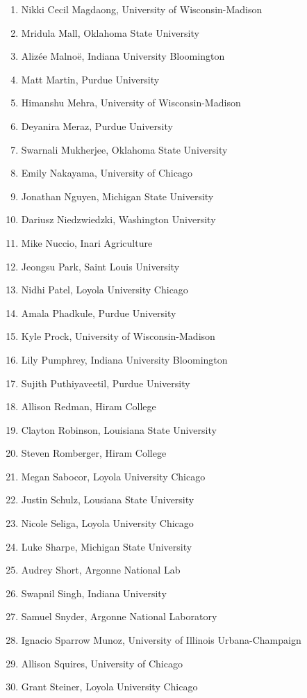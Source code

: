 \begin{multicols}{2}
\begin{enumerate}
\item Nikki Cecil	Magdaong,	University of Wisconsin-Madison
\item Mridula 	Mall,	Oklahoma State University
\item Alizée	Malnoë,	Indiana University Bloomington
\item Matt	Martin,	Purdue University
\item Himanshu 	Mehra,	University of Wisconsin-Madison
\item Deyanira	Meraz,	Purdue University
\item Swarnali	Mukherjee,	Oklahoma State University
\item Emily	Nakayama,	University of Chicago
\item Jonathan	Nguyen,	Michigan State University
\item Dariusz	Niedzwiedzki,	Washington University
\item Mike	Nuccio,	Inari Agriculture
\item Jeongsu	Park,	Saint Louis University
\item Nidhi	Patel,	Loyola University Chicago
\item Amala 	Phadkule,	Purdue University
\item Kyle	Prock,	University of Wisconsin-Madison
\item Lily	Pumphrey,	Indiana University Bloomington
\item Sujith	Puthiyaveetil,	Purdue University 
\item Allison	Redman,	Hiram College
\item Clayton	Robinson,	Louisiana State University
\item Steven	Romberger,	Hiram College
\item Megan	Sabocor,	Loyola University Chicago
\item Justin	Schulz,	Lousiana State University
\item Nicole	Seliga,	Loyola University Chicago
\item Luke	Sharpe,	Michigan State University
\item Audrey	Short,	Argonne National Lab
\item Swapnil	Singh,	Indiana University
\item Samuel	Snyder,	Argonne National Laboratory
\item Ignacio	Sparrow Munoz,	University of Illinois Urbana-Champaign
\item Allison	Squires,	University of Chicago
\item Grant	Steiner,	Loyola University Chicago

\end{enumerate}
\end{multicols}
